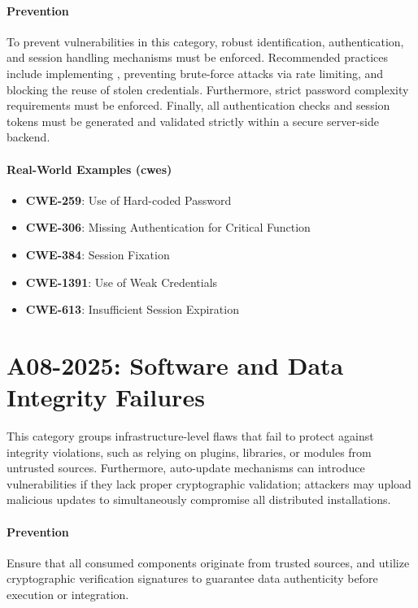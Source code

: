 \paragraph{Prevention} To prevent vulnerabilities in this category, robust identification, authentication, and session handling mechanisms must be enforced. Recommended practices include implementing , preventing brute-force attacks via rate limiting, and blocking the reuse of stolen credentials. Furthermore, strict password complexity requirements must be enforced. Finally, all authentication checks and session tokens must be generated and validated strictly within a secure server-side backend.

\paragraph{Real-World Examples (\glspl{cwe})}
\begin{itemize}
    \item \textbf{CWE-259}: Use of Hard-coded Password
    \item \textbf{CWE-306}: Missing Authentication for Critical Function
    \item \textbf{CWE-384}: Session Fixation
    \item \textbf{CWE-1391}: Use of Weak Credentials
    \item \textbf{CWE-613}: Insufficient Session Expiration
\end{itemize}

\section{A08-2025: Software and Data Integrity Failures}
This category groups infrastructure-level flaws that fail to protect against integrity violations, such as relying on plugins, libraries, or modules from untrusted sources. Furthermore, auto-update mechanisms can introduce vulnerabilities if they lack proper cryptographic validation; attackers may upload malicious updates to simultaneously compromise all distributed installations.

\paragraph{Prevention} Ensure that all consumed components originate from trusted sources, and utilize cryptographic verification signatures to guarantee data authenticity before execution or integration.

